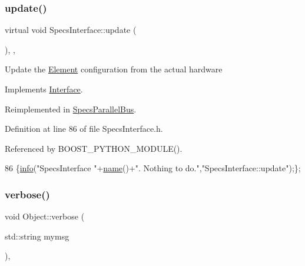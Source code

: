 \subsubsection{\texorpdfstring{update()}{update()}}
{\footnotesize\ttfamily virtual void Specs\+Interface\+::update (\begin{DoxyParamCaption}{ }\end{DoxyParamCaption})\hspace{0.3cm}{\ttfamily [inline]}, {\ttfamily [virtual]}, {\ttfamily [inherited]}}

Update the \hyperlink{classElement}{Element} configuration from the actual hardware 

Implements \hyperlink{classInterface_a30e71ffbe36091df9f7c0838dd4b60d2}{Interface}.



Reimplemented in \hyperlink{classSpecsParallelBus_ab07e067b62824162d7dc86bfbf4ef096}{Specs\+Parallel\+Bus}.



Definition at line 86 of file Specs\+Interface.\+h.



Referenced by B\+O\+O\+S\+T\+\_\+\+P\+Y\+T\+H\+O\+N\+\_\+\+M\+O\+D\+U\+L\+E().


\begin{DoxyCode}
86 \{\hyperlink{classObject_a644fd329ea4cb85f54fa6846484b84a8}{info}(\textcolor{stringliteral}{"SpecsInterface "}+\hyperlink{classObject_a300f4c05dd468c7bb8b3c968868443c1}{name}()+\textcolor{stringliteral}{". Nothing to do."},\textcolor{stringliteral}{"SpecsInterface::update"});\};
\end{DoxyCode}
\mbox{\label{classObject_a83d2db2df682907ea1115ad721c1c4a1}} 
\subsubsection{\texorpdfstring{verbose()}{verbose()}\hspace{0.1cm}{\footnotesize\ttfamily [1/2]}}
{\footnotesize\ttfamily void Object\+::verbose (\begin{DoxyParamCaption}\item[{std\+::string}]{mymsg }\end{DoxyParamCaption})\hspace{0.3cm}{\ttfamily [inline]}, {\ttfamily [inherited]}}



